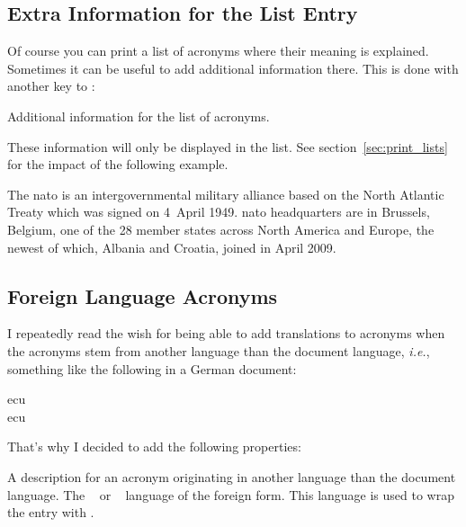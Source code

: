 \documentclass[load-preamble+]{cnltx-doc}
\newcommand*\latin{\textit}
\begin{document}
\subsection{Extra Information for the List Entry}
Of course you can print a list of acronyms where their meaning is explained.
Sometimes it can be useful to add additional information there.  This is done
with another key to :
\begin{options}
    Additional information for the list of acronyms.
\end{options}
These information will only be displayed in the list.  See
section~\vref{sec:print_lists} for the impact of the following example.

\begin{example}
  The \ac{nato} is an intergovernmental military alliance based on the
  North Atlantic Treaty which was signed on 4~April 1949. \ac{nato}
  headquarters are in Brussels, Belgium, one of the 28 member states
  across North America and Europe, the newest of which, Albania and
  Croatia, joined in April 2009.
\end{example}

\subsection{Foreign Language Acronyms}\label{ssec:foreign}
I repeatedly read the wish for being able to add translations to acronyms when
the acronyms stem from another language than the document language,
\latin{i.e.}, something like the following in a German document:
\begin{example}
  \ac{ecu}\\
  \ac{ecu}
\end{example}
That's why I decided to add the following properties:
\begin{options}
    A description for an acronym originating in another language than the
    document language.
    The ~\cite{pkg:babel} or
    ~\cite{pkg:polyglossia} language of the foreign form.
    This language is used to wrap the entry with
    .
\end{options}
\end{document}
